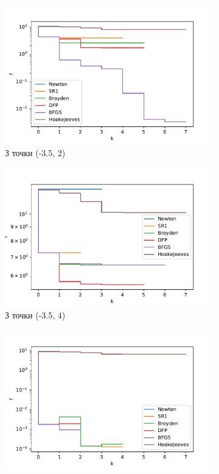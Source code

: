 \clearpage
\begin{figure}[h!]
    \begin{subfigure}{0.5\textwidth}
        \includegraphics[width=\textwidth, trim=0cm 0cm 1.2cm 1cm, clip]{assets/descent_steps/ackley_steps_0.pdf}
        \caption{З точки (-3.5, 2)}
    \end{subfigure}
    \begin{subfigure}{0.5\textwidth}
        \includegraphics[width=\textwidth, trim=0cm 0cm 1.2cm 1cm, clip]{assets/descent_steps/ackley_steps_1.pdf}
        \caption{З точки (-3.5, 4)}
    \end{subfigure}
    \begin{subfigure}{0.5\textwidth}
        \includegraphics[width=\textwidth, trim=0cm 0cm 1.2cm 1cm, clip]{assets/descent_steps/ackley_steps_2.pdf}

\end{subfigure}
\end{figure}
